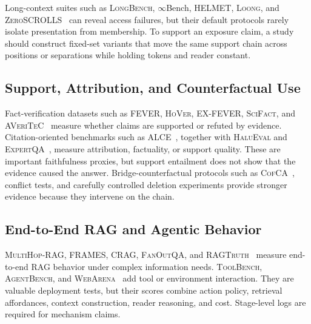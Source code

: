 \documentclass[manuscript,review]{acmart}
\theoremstyle{definition}
\theoremstyle{plain}
\theoremstyle{remark}
\begin{document}
Long-context suites such as \textsc{LongBench}, $\infty$Bench,
\textsc{HELMET}, \textsc{Loong}, and \textsc{ZeroSCROLLS}~\cite{bai2024longbench,zhang2024infinitybench,yen2024helmet,wang2024loong,shaham2023zeroscrolls}
can reveal access failures, but their default protocols rarely isolate
presentation from membership. To support an exposure claim, a study should
construct fixed-set variants that move the same support chain across
positions or separations while holding tokens and reader constant.

\subsection{Support, Attribution, and Counterfactual Use}
\label{subsec:faithfulness_diagnostics}

Fact-verification datasets such as \textsc{FEVER}, \textsc{HoVer},
\textsc{EX-FEVER}, \textsc{SciFact}, and \textsc{AVeriTeC}~\cite{thorne2018fever,jiang2020hover,ma2024exfever,wadden2020scifact,schlichtkrull2024averitec}
measure whether claims are supported or refuted by evidence. Citation-oriented
benchmarks such as \textsc{ALCE}~\cite{gao2023alce}, together with
\textsc{HaluEval} and \textsc{ExpertQA}~\cite{li2023halueval,malaviya2024expertqa},
measure attribution, factuality, or support quality. These are important
faithfulness proxies, but support entailment does not show that the evidence
caused the answer. Bridge-counterfactual protocols such as
\textsc{CofCA}~\cite{wu2024cofca}, conflict tests, and carefully controlled
deletion experiments provide stronger evidence because they intervene on the
chain.

\subsection{End-to-End RAG and Agentic Behavior}
\label{subsec:rag_specific_diagnostics}

\textsc{MultiHop-RAG}, \textsc{FRAMES}, \textsc{CRAG},
\textsc{FanOutQA}, and \textsc{RAGTruth}~\cite{tang2024multihoprag,krishna2024frames,yang2024crag,zhu2024fanoutqa,niu2024ragtruth}
measure end-to-end RAG behavior under complex information needs.
\textsc{ToolBench}, \textsc{AgentBench}, and \textsc{WebArena}~\cite{qin2023toolbench,liu2024agentbench,zhou2024webarena}
add tool or environment interaction. They are valuable deployment tests, but
their scores combine action policy, retrieval affordances, context
construction, reader reasoning, and cost. Stage-level logs are required for
mechanism claims.
\end{document}
